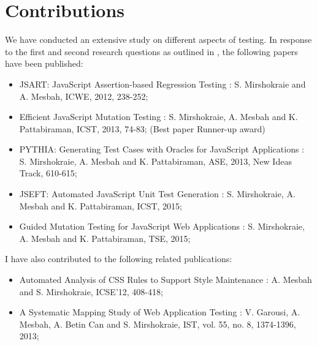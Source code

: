 \section{Contributions} \label{Sec:contrib}
We have conducted an
extensive study on different aspects of \javascript testing. In response to the first and second research questions as outlined in , the following papers have been published:
\begin{itemize}
\item JSART: JavaScript Assertion-based Regression Testing \cite{mirshokraie:icwe12}:
S. Mirshokraie and A. Mesbah, ICWE, 2012, 238-252;
\item Efficient JavaScript Mutation Testing \cite{mirshokraie:icst13}:
S. Mirshokraie, A. Mesbah and K. Pattabiraman, ICST, 2013, 74-83; (Best paper Runner-up award)
\item PYTHIA: Generating Test Cases with Oracles
for JavaScript Applications \cite{shabnam:ase13}: 
S. Mirshokraie, A. Mesbah and K. Pattabiraman, ASE, 2013, New Ideas Track, 610-615;
\item JSEFT: Automated JavaScript Unit Test Generation \cite{mirshokraie:icst15}:
S. Mirshokraie, A. Mesbah and K. Pattabiraman, ICST, 2015;
\item Guided Mutation Testing for JavaScript Web Applications \cite{mirshokraie:tse15}:
S. Mirshokraie, A. Mesbah and K. Pattabiraman, TSE, 2015;
\end{itemize}

I have also contributed to the following related publications:
\begin{itemize}
\item Automated Analysis of CSS Rules to Support Style Maintenance \cite{mesbah:icse12}: 
A. Mesbah and S. Mirshokraie, ICSE'12, 408-418;
\item A Systematic Mapping Study of Web Application Testing \cite{garousi:ist13}: 
V. Garousi, A. Mesbah, A. Betin Can and S. Mirshokraie, IST, vol. 55, no. 8, 1374-1396, 2013;
\end{itemize}
